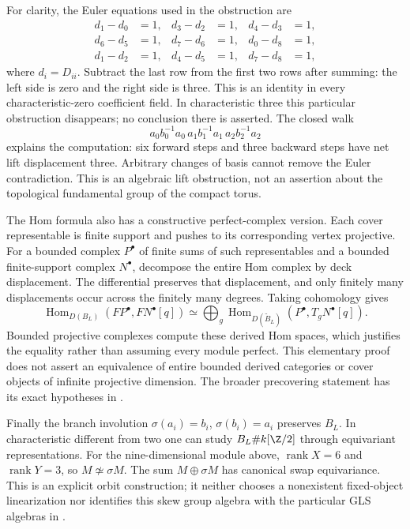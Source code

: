 \documentclass[11pt,oneside,openany]{book}
\theoremstyle{definition}\newtheorem{definition}[theorem]{Definition}
\theoremstyle{remark}\newtheorem{remark}[theorem]{Remark}
\begin{document}
For clarity, the Euler equations used in the obstruction are
\begin{align*}
 d_1-d_0&=1,&d_3-d_2&=1,&d_4-d_3&=1,\\
 d_6-d_5&=1,&d_7-d_6&=1,&d_0-d_8&=1,\\
 d_1-d_2&=1,&d_4-d_5&=1,&d_7-d_8&=1,
\end{align*}
where $d_i=D_{ii}$. Subtract the last row from the first two rows after
summing: the left side is zero and the right side is three. This is an
identity in every characteristic-zero coefficient field. In characteristic
three this particular obstruction disappears; no conclusion there is
asserted. The closed walk
\[
 a_0b_0^{-1}a_0\,a_1b_1^{-1}a_1\,a_2b_2^{-1}a_2
\]
explains the computation: six forward steps and three backward steps have
net lift displacement three. Arbitrary changes of basis cannot remove the
Euler contradiction. This is an algebraic lift obstruction, not an
assertion about the topological fundamental group of the compact torus.

The Hom formula also has a constructive perfect-complex version. Each
cover representable is finite support and pushes to its corresponding
vertex projective. For a bounded complex $P^\bullet$ of finite sums of such
representables and a bounded finite-support complex $N^\bullet$, decompose
the entire Hom complex by deck displacement. The differential preserves
that displacement, and only finitely many displacements occur across the
finitely many degrees. Taking cohomology gives
\[
 \operatorname{Hom}_{D(B_L)}(FP^\bullet,FN^\bullet[q])
 \simeq\bigoplus_g
 \operatorname{Hom}_{D(\widetilde B_L)}(P^\bullet,T_gN^\bullet[q]).
\]
Bounded projective complexes compute these derived Hom spaces, which
justifies the equality rather than assuming every module perfect. This
elementary proof does not assert an equivalence of entire bounded derived
categories or cover objects of infinite projective dimension. The broader
precovering statement has its exact hypotheses in
\cite[Theorem~4.28]{CoveringLecture2026}.

Finally the branch involution $\sigma(a_i)=b_i$, $\sigma(b_i)=a_i$
preserves $B_L$. In characteristic different from two one can study
$B_L\#k[\Z/2]$ through equivariant representations. For the nine-dimensional
module above, $\operatorname{rank}X=6$ and $\operatorname{rank}Y=3$, so
$M\not\simeq\sigma M$. The sum $M\oplus\sigma M$ has canonical swap
equivariance. This is an explicit orbit construction; it neither chooses a
nonexistent fixed-object linearization nor identifies this skew group
algebra with the particular GLS algebras in \cite{TameGLS2026}.
\end{document}
